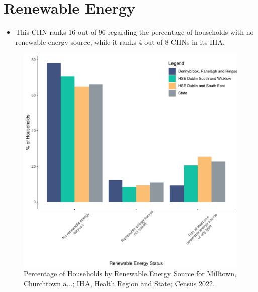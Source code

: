 \documentclass{article}
\begin{document}
\section{Renewable Energy}\label{sect:RE}
\begin{itemize}
\item This CHN ranks  16 out of 96 regarding the percentage of households with no renewable energy source, while it ranks   4 out of 8 CHNs in its IHA.
\end{itemize}
\begin{figure}[H]
	\centering
	\includegraphics[width = 140mm]{../figures/RenewableEnergyED.pdf}
	\caption{Percentage of Households by Renewable Energy Source for Milltown, Churchtown a...; IHA, Health Region and State; Census 2022.}
	\label{fig:vbnv}
	\end{figure}
\end{document}
